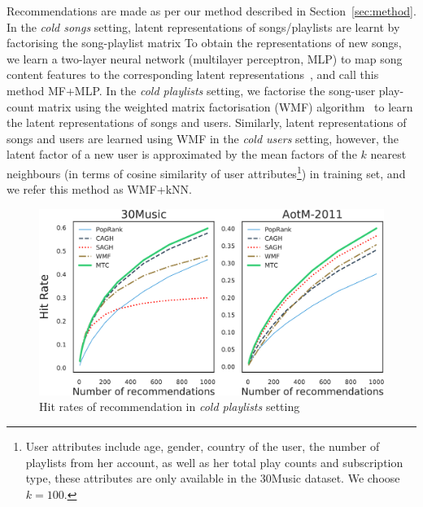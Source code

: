 \begin{itemize}
      Recommendations are made as per our method described in Section~\ref{sec:method}.
      In the \emph{cold songs} setting, latent representations of songs/playlists are learnt by factorising the song-playlist matrix  
      To obtain the representations of new songs, we learn a two-layer neural network (multilayer perceptron, MLP) to map song 
      content features to the corresponding latent representations~\cite{Gantner:2010,van2013deep}, and call this method MF+MLP. 
      In the \emph{cold playlists} setting, we factorise the song-user play-count matrix using the weighted matrix factorisation (WMF) 
      algorithm~\cite{hu2008collaborative,van2013deep} to learn the latent representations of songs and users.
      Similarly, latent representations of songs and users are learned using WMF in the \emph{cold users} setting, however, the latent 
      factor of a new user is approximated by the mean factors of the $k$ nearest neighbours (in terms of cosine similarity of user 
      attributes\footnote{User attributes include age, gender, country of the user, the number of playlists from her account, as well as 
      her total play counts and subscription type, these attributes are only available in the 30Music dataset. We choose $k=100$.}) 
      in training set, and we refer this method as WMF+kNN.
\end{itemize}


\begin{figure}[!t]
    \centering
    \includegraphics[width=\columnwidth]{fig/hr3.pdf}
    \caption{Hit rates of recommendation in \emph{cold playlists} setting}
\end{figure}


